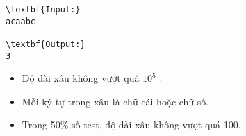 \begin{verbatim}
\textbf{Input:}
acaabc

\textbf{Output:}
3\end{verbatim}
\begin{itemize}
	\item Độ dài xâu không vượt quá $10^{5}$ .
	\item Mỗi ký tự trong xâu là chữ cái hoặc chữ số.
	\item Trong 50\% số test, độ dài xâu không vượt quá 100.
\end{itemize}